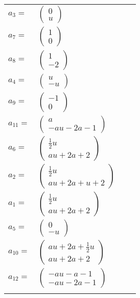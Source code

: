 \documentclass[1p]{elsarticle_modified}
\theoremstyle{definition}
\begin{document}
\begin{tabular}{m{7pt} m{180pt} m{7pt} m{180pt} }
\flushright $a_{3}=$&$\begin{pmatrix}0\\u\end{pmatrix}$ \\
\flushright $a_{7}=$&$\begin{pmatrix}1\\0\end{pmatrix}$ \\
\flushright $a_{8}=$&$\begin{pmatrix}1\\-2\end{pmatrix}$ \\
\flushright $a_{4}=$&$\begin{pmatrix}u\\- u\end{pmatrix}$ \\
\flushright $a_{9}=$&$\begin{pmatrix}-1\\0\end{pmatrix}$ \\
\flushright $a_{11}=$&$\begin{pmatrix}a\\- a u-2 a-1\end{pmatrix}$ \\
\flushright $a_{6}=$&$\begin{pmatrix}\frac{1}{2} u\\a u+2 a+2\end{pmatrix}$ \\
\flushright $a_{2}=$&$\begin{pmatrix}\frac{1}{2} u\\a u+2 a+u+2\end{pmatrix}$ \\
\flushright $a_{1}=$&$\begin{pmatrix}\frac{1}{2} u\\a u+2 a+2\end{pmatrix}$ \\
\flushright $a_{5}=$&$\begin{pmatrix}0\\- u\end{pmatrix}$ \\
\flushright $a_{10}=$&$\begin{pmatrix}a u+2 a+\frac{1}{2} u\\a u+2 a+2\end{pmatrix}$ \\
\flushright $a_{12}=$&$\begin{pmatrix}- a u- a-1\\- a u-2 a-1\end{pmatrix}$\\&\end{tabular}
\end{document}
